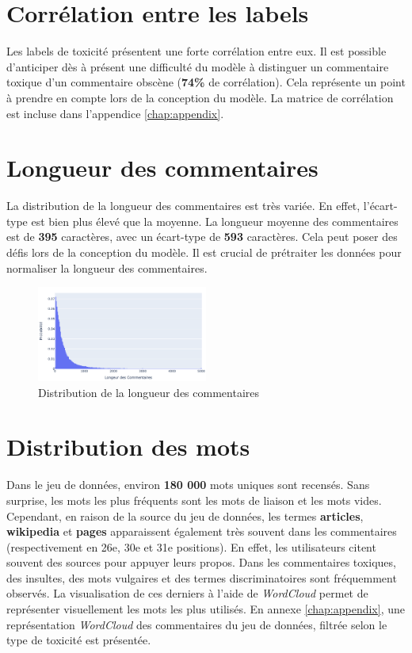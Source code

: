 \newpage
\section*{Corrélation entre les labels}
Les labels de toxicité présentent une forte corrélation entre eux. 
Il est possible d'anticiper dès à présent une difficulté du modèle à distinguer un commentaire toxique d'un commentaire obscène (\textbf{74\%} de corrélation).
Cela représente un point à prendre en compte lors de la conception du modèle. La matrice de corrélation est incluse dans l'appendice \ref{chap:appendix}. 

\section*{Longueur des commentaires}
La distribution de la longueur des commentaires est très variée. En effet, l'écart-type est bien plus élevé que la moyenne. 
La longueur moyenne des commentaires est de \textbf{395} caractères, avec un écart-type de \textbf{593} caractères. 
Cela peut poser des défis lors de la conception du modèle. Il est crucial de prétraiter les données pour normaliser la longueur des commentaires.
\begin{figure}[h]
    \centering
    \includegraphics[width=0.5\textwidth]{figures/long-commentaire-prob.png}
    \caption{Distribution de la longueur des commentaires}
\end{figure}

\section*{Distribution des mots}
Dans le jeu de données, environ \textbf{180 000} mots uniques sont recensés. 
Sans surprise, les mots les plus fréquents sont les mots de liaison et les mots vides.
Cependant, en raison de la source du jeu de données, les termes \textbf{articles}, \textbf{wikipedia} et \textbf{pages} apparaissent également très souvent dans les commentaires (respectivement en 26e, 30e et 31e positions).
En effet, les utilisateurs citent souvent des sources pour appuyer leurs propos. Dans les commentaires toxiques, des insultes, des mots vulgaires et des termes discriminatoires sont fréquemment observés. 
La visualisation de ces derniers à l'aide de \textit{WordCloud} permet de représenter visuellement les mots les plus utilisés. 
En annexe \ref{chap:appendix}, une représentation \textit{WordCloud} des commentaires du jeu de données, filtrée selon le type de toxicité est présentée.